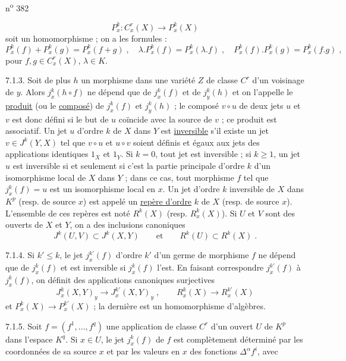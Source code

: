 \hfill n\textsuperscript{o} 382

\[
P^k_x:C^r_x(X)\longrightarrow P^k_x(X)
\]
soit un homomorphisme ; on a les formules :
\[
P^k_x(f)+P^k_x(g)=P^k_x(f+g)\;,\quad\lambda.P^k_x(f)=P^k_x(\lambda.f)\;,\quad P^k_x(f).P^k_x(g)=P^k_x(f.g)\;,
\]
pour $f,g\in C^r_x(X)$, $\lambda\in K$.

7.1.3. Soit de plus $h$ un morphisme dans une variété $Z$ de classe $C^r$ d'un voisinage de $y$. Alors $j^k_x(h\circ f)$ ne dépend que de $j^k_x(f)$ et de $j^k_y(h)$ et on l'appelle le \uline{produit} (ou le \uline{composé}) de $j^k_x(f)$ et $j^k_y(h)$ ; le composé $v\circ u$ de deux jets $u$ et $v$ est donc défini si le but de $u$ coïncide avec la source de $v$ ; ce produit est associatif. Un jet $u$ d'ordre $k$ de $X$ dans $Y$ est \uline{inversible} s'il existe un jet $v\in J^k(Y,X)$ tel que $v\circ u$ et $u\circ v$ soient définis et égaux aux jets des applications identiques $1_X$ et $1_Y$. Si $k=0$, tout jet est inversible ; si $k\geq 1$, un jet $u$ est inversible si et seulement si c'est la partie principale d'ordre $k$ d'un isomorphisme local de $X$ dans $Y$ ; dans ce cas, tout morphisme $f$ tel que $j^k_x(f)=u$ est un isomorphisme local en $x$. Un jet d'ordre $k$ inversible de $X$ dans $K^p$ (resp. de source $x$) est appelé un \uline{repère d'ordre} $k$ de $X$ (resp. de source $x$). L'ensemble de ces repères est noté $R^k(X)$ (resp. $R^k_x(X)$). Si $U$ et $V$ sont des ouverts de $X$ et $Y$, on a des inclusions canoniques
\[
J^k(U,V)\subset J^k(X,Y)\qquad\text{et}\qquad R^k(U)\subset R^k(X)\;.
\]

7.1.4. Si $k'\leq k$, le jet $j^{k'}_x(f)$ d'ordre $k'$ d'un germe de morphisme $f$ ne dépend que de $j^k_x(f)$ et est inversible si $j^k_x(f)$ l'est. En faisant correspondre $j^{k'}_x(f)$ à $j^k_x(f)$, on définit des applications canoniques surjectives
\[
J^k_x(X,Y)_y\longrightarrow J^{k'}_x(X,Y)_y\;,\qquad R^k_x(X)\longrightarrow R^{k'}_x(X)
\]
et $P^k_x(X)\longrightarrow P^{k'}_x(X)$ ; la dernière est un homomorphisme d'algèbres.

7.1.5. Soit $f=(f^1,\ldots,f^q)$ une application de classe $C^r$ d'un ouvert $U$ de $K^p$ dans l'espace $K^q$. Si $x\in U$, le jet $j^k_x(f)$ de $f$ est complètement déterminé par les coordonnées de sa source $x$ et par les valeurs en $x$ des fonctions $\Delta^\alpha f^i$, avec
